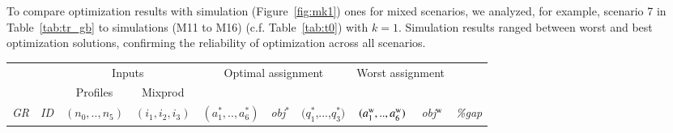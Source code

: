 \documentclass[review,12pt, 3p, times]{elsarticle}
\begin{document}
To compare optimization results with simulation (Figure~\ref{fig:mk1})  ones for mixed scenarios, we analyzed, for example, scenario 7 in Table~\ref{tab:tr_gb} to simulations (M11 to M16) (c.f. Table~\ref{tab:t0}) with $k=1$. Simulation results ranged between worst and best optimization solutions, confirming the reliability of optimization across all scenarios.
	
	
\begin{longtable}{|c|c|c|c|c|c|c|c|c|r|}
	\hline
	& & \multicolumn{2}{c|}{Inputs} & \multicolumn{3}{c|}{Optimal assignment} & \multicolumn{2}{c|}{Worst assignment }& \\
	& \multicolumn{1}{c|}{ } & \multicolumn{1}{c|}{Profiles} & \multicolumn{1}{c|}{Mixprod}& \multicolumn{1}{c}{}  & \multicolumn{2}{c|}{} & \multicolumn{2}{c|}{}&\multicolumn{1}{c|}{}\\
	\it{GR} & \it{ID} & \multicolumn{1}{c|}{$(n_0,..,n_5)$} & \multicolumn{1}{c|}{$(i_1,i_2,i_3)$} & {$(a^*_1,..,a^*_6)$} & \it{obj}$^*$ & $(q^*_1$,...,$q^*_3)$ & {$(a^{\textsc{w}}_1,..,a^{\textsc{w}}_6)$} & \it{obj}$^{\textsc{w}}$ & \it{\%gap} \\ %
																										

\end{longtable}
\end{document}
